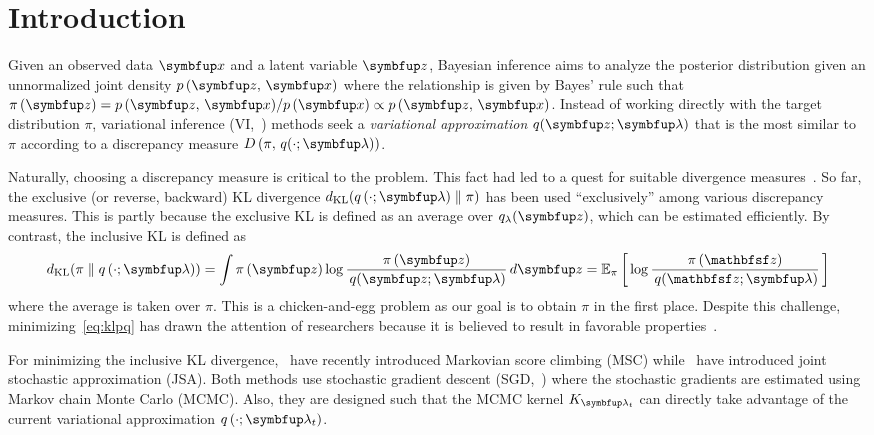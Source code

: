 
\section{Introduction}
Given an observed data \(\vx\) and a latent variable \(\vz\), Bayesian inference aims to analyze the posterior distribution  given an unnormalized joint density \(p\,(\vz,\,\vx)\) where the relationship is given by Bayes' rule such that \(\pi\,(\vz) = {p\,(\vz,\,\vx)}/{p\,(\vx)} \propto p\,(\vz,\,\vx)\).
Instead of working directly with the target distribution \(\pi\), variational inference (VI,~\citealt{blei_variational_2017}) methods seek a \textit{variational approximation} \(q(\vz; \vlambda)\) that is the most similar to \(\pi\) according to a discrepancy measure \(D\,(\pi,\, q(\cdot; \vlambda))\).

Naturally, choosing a discrepancy measure is critical to the problem.
This fact had led to a quest for suitable divergence measures~\citep{pmlr-v37-salimans15, NIPS2016_7750ca35, NIPS2017_35464c84, NEURIPS2018_1cd138d0, pmlr-v97-ruiz19a}.
So far, the exclusive (or reverse, backward)  KL divergence \(\DKL{q\left(\cdot; \vlambda\right)}{\pi}\) has been used ``exclusively'' among various discrepancy measures.
This is partly because the exclusive KL is defined as an average over \(q_{\lambda}(\vz)\), which can be estimated efficiently.
By contrast, the inclusive KL is defined as
%
{\small
\vspace{-0.05in}
\begin{align}
  \DKL{\pi}{q\left(\cdot; \vlambda\right)}
  = \int \pi\,(\vz) \log \frac{\pi\left(\vz\right)}{\,q(\vz; \vlambda)} \,d\vz
  = \Esub{\pi}{\log \frac{\pi\left(\rvvz\right)}{\,q(\rvvz; \vlambda)} } \label{eq:klpq}
\end{align}
}%
%
where the average is taken over \(\pi\). 
This is a chicken-and-egg problem as our goal is to obtain \(\pi\) in the first place.
Despite this challenge, minimizing~\eqref{eq:klpq} has drawn the attention of researchers because it is believed to result in favorable properties~\citep{minka2005divergence, mackay_local_2001}.

For minimizing the inclusive KL divergence,~\citet{NEURIPS2020_b2070693} have recently introduced Markovian score climbing (MSC) while~\citet{pmlr-v124-ou20a} have introduced joint stochastic approximation (JSA).
Both methods use stochastic gradient descent (SGD,~\citealt{robbins_stochastic_1951}) where the stochastic gradients are estimated using Markov chain Monte Carlo (MCMC).
Also, they are designed such that the MCMC kernel \(K_{\vlambda_t}\) can directly take advantage of the current variational approximation \(q\left(\cdot; \vlambda_t\right)\).

